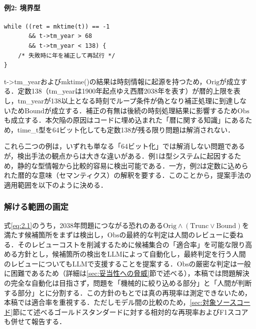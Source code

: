 \documentclass[submit,techrep,noauthor]{ipsj}
\begin{document}
\paragraph*{例2: 境界型}

\begin{tcolorbox}[
	enhanced,
	breakable,
	colframe=black,
	colback=black!4,
	coltext=black,
	left=2mm,
	right=2mm,
	top=2mm,
	bottom=2mm,
	enlarge top by=4pt,
	enlarge bottom by=4pt,
	before skip=4pt,
	after skip=4pt,
]
\begin{verbatim}
while ((ret = mktime(t)) == -1
       && t->tm_year > 68
       && t->tm_year < 138) {
    /* 失敗時に年を補正して再試行 */
}
\end{verbatim}
\end{tcolorbox}

t-\textgreater tm\_yearおよびmktime()の結果は時刻情報に起源を持つため，$\mathrm{Orig}$が成立する．定数138（tm\_yearは1900年起点ゆえ西暦2038年を表す）が暦的上限を表し，tm\_yearが138以上となる時刻でループ条件が偽となり補正処理に到達しないため$\mathrm{Bound}$が成立する．補正の有無は後続の時刻処理結果に影響するため$\mathrm{Obs}$も成立する．本欠陥の原因はコードに埋め込まれた「暦に関する知識」にあるため，time\_t型を64ビット化しても定数138が残る限り問題は解消されない．

これら二つの例は，いずれも単なる「64ビット化」では解消しない問題であるが，検出手法の観点からは大きな違いがある．例1は型システムに起因するため，静的な型情報から比較的容易に検出可能である．一方，例2は定数に込められた暦的な意味（セマンティクス）の解釈を要する．このことから，提案手法の適用範囲を以下のように決める．

\subsubsection{解ける範囲の画定}
\label{sec:解ける範囲の画定}

式\ref{eq:2.1}のうち，2038年問題につながる恐れのある$\mathrm{Orig} \land (\mathrm{Trunc} \lor \mathrm{Bound})$を満たす候補箇所をまずは検出し，$\mathrm{Obs}$の最終的な判定は人間のレビューに委ねる．そのレビューコストを削減するために候補集合の「適合率」を可能な限り高める方針とし，候補箇所の検出をLLMによって自動化し，最終判定を行う人間のレビューについてもLLMで支援することを提案する．$\mathrm{Obs}$の厳密な判定は一般に困難であるため（詳細は\ref{sec:妥当性への脅威}節で述べる），本稿では問題解決の完全な自動化は目指さず，問題を「機械的に絞り込める部分」と「人間が判断する部分」とに分割する．この方針のもとでは真の再現率は測定できないため，本稿では適合率を重視する．ただしモデル間の比較のため，\ref{sec:対象ソースコード}節にて述べるゴールドスタンダードに対する相対的な再現率およびF1スコアも併せて報告する．
\end{document}
